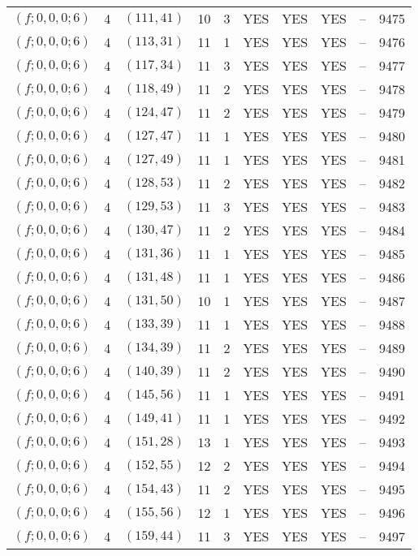 \begin{longtable}{|c|c|c|c|c|c|c|c|c|c|}
$(f; 0, 0, 0; 6)$ & 4 & $(111, 41)$ & 10 & 3 & YES & YES & YES & -- & 9475\\
$(f; 0, 0, 0; 6)$ & 4 & $(113, 31)$ & 11 & 1 & YES & YES & YES & -- & 9476\\
$(f; 0, 0, 0; 6)$ & 4 & $(117, 34)$ & 11 & 3 & YES & YES & YES & -- & 9477\\
$(f; 0, 0, 0; 6)$ & 4 & $(118, 49)$ & 11 & 2 & YES & YES & YES & -- & 9478\\
$(f; 0, 0, 0; 6)$ & 4 & $(124, 47)$ & 11 & 2 & YES & YES & YES & -- & 9479\\
$(f; 0, 0, 0; 6)$ & 4 & $(127, 47)$ & 11 & 1 & YES & YES & YES & -- & 9480\\
$(f; 0, 0, 0; 6)$ & 4 & $(127, 49)$ & 11 & 1 & YES & YES & YES & -- & 9481\\
$(f; 0, 0, 0; 6)$ & 4 & $(128, 53)$ & 11 & 2 & YES & YES & YES & -- & 9482\\
$(f; 0, 0, 0; 6)$ & 4 & $(129, 53)$ & 11 & 3 & YES & YES & YES & -- & 9483\\
$(f; 0, 0, 0; 6)$ & 4 & $(130, 47)$ & 11 & 2 & YES & YES & YES & -- & 9484\\
$(f; 0, 0, 0; 6)$ & 4 & $(131, 36)$ & 11 & 1 & YES & YES & YES & -- & 9485\\
$(f; 0, 0, 0; 6)$ & 4 & $(131, 48)$ & 11 & 1 & YES & YES & YES & -- & 9486\\
$(f; 0, 0, 0; 6)$ & 4 & $(131, 50)$ & 10 & 1 & YES & YES & YES & -- & 9487\\
$(f; 0, 0, 0; 6)$ & 4 & $(133, 39)$ & 11 & 1 & YES & YES & YES & -- & 9488\\
$(f; 0, 0, 0; 6)$ & 4 & $(134, 39)$ & 11 & 2 & YES & YES & YES & -- & 9489\\
$(f; 0, 0, 0; 6)$ & 4 & $(140, 39)$ & 11 & 2 & YES & YES & YES & -- & 9490\\
$(f; 0, 0, 0; 6)$ & 4 & $(145, 56)$ & 11 & 1 & YES & YES & YES & -- & 9491\\
$(f; 0, 0, 0; 6)$ & 4 & $(149, 41)$ & 11 & 1 & YES & YES & YES & -- & 9492\\
$(f; 0, 0, 0; 6)$ & 4 & $(151, 28)$ & 13 & 1 & YES & YES & YES & -- & 9493\\
$(f; 0, 0, 0; 6)$ & 4 & $(152, 55)$ & 12 & 2 & YES & YES & YES & -- & 9494\\
$(f; 0, 0, 0; 6)$ & 4 & $(154, 43)$ & 11 & 2 & YES & YES & YES & -- & 9495\\
$(f; 0, 0, 0; 6)$ & 4 & $(155, 56)$ & 12 & 1 & YES & YES & YES & -- & 9496\\
$(f; 0, 0, 0; 6)$ & 4 & $(159, 44)$ & 11 & 3 & YES & YES & YES & -- & 9497\\

\end{longtable}
